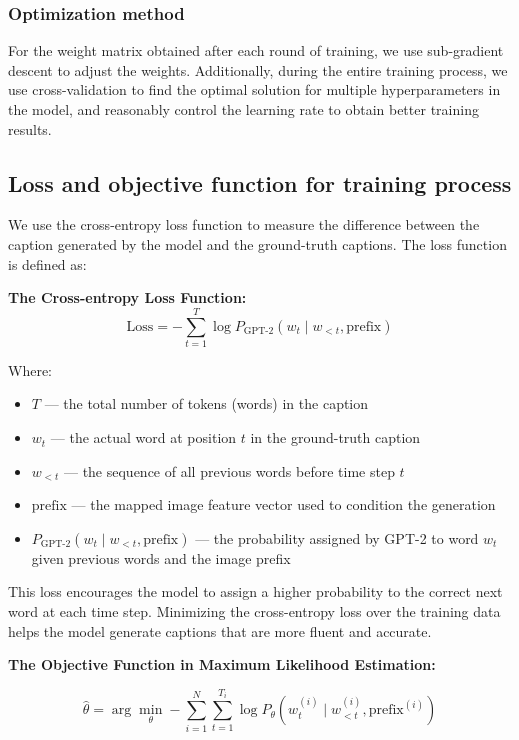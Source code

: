 \documentclass[11pt]{article}
\begin{document}
    \subsubsection{Optimization method}
    For the weight matrix obtained after each round of training, we use sub-gradient descent 
    to adjust the weights. Additionally, during the entire training process, we use cross-validation to 
    find the optimal solution for multiple hyperparameters in the model, and reasonably control the learning rate to obtain better training results.
\subsection{Loss and objective function for training process}

We use the cross-entropy loss function to measure the difference between the caption generated by the model and the ground-truth captions. The loss function is defined as:

\textbf{The Cross-entropy Loss Function:}
\begin{equation}
\text{Loss} = -\sum_{t=1}^{T} \log P_{\text{GPT-2}}(w_t \mid w_{<t}, \text{prefix})
\end{equation}

Where:  
\begin{itemize}
    \item $T$ — the total number of tokens (words) in the caption  
    \item $w_t$ — the actual word at position $t$ in the ground-truth caption  
    \item $w_{<t}$ — the sequence of all previous words before time step $t$  
    \item $\text{prefix}$ — the mapped image feature vector used to condition the generation  
    \item $P_{\text{GPT-2}}(w_t \mid w_{<t}, \text{prefix})$ — the probability assigned by GPT-2 to word $w_t$ given previous words and the image prefix
\end{itemize}

This loss encourages the model to assign a higher 
probability to the correct next word at each time step. 
Minimizing the cross-entropy loss over the training data 
helps the model generate captions that are more fluent 
and accurate.

\pagebreak
\textbf{The Objective Function in Maximum Likelihood Estimation:}

\begin{equation}
\hat{\theta} = \arg\min_{\theta} -\sum_{i=1}^{N} \sum_{t=1}^{T_i} \log P_\theta(w_t^{(i)} \mid w_{<t}^{(i)}, \text{prefix}^{(i)})
\end{equation}
\end{document}
